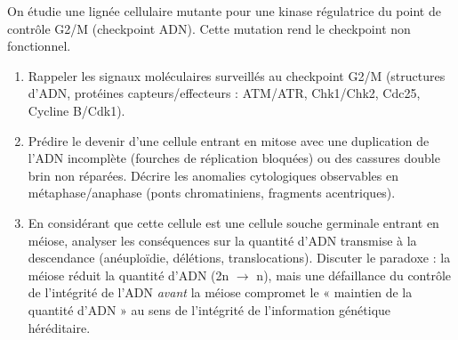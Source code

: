 \documentclass[11pt]{article}
\begin{document}
\begin{exercice}
On étudie une lignée cellulaire mutante pour une kinase régulatrice du point de contrôle G2/M (checkpoint ADN). Cette mutation rend le checkpoint non fonctionnel.
\begin{enumerate}
    \item Rappeler les signaux moléculaires surveillés au checkpoint G2/M (structures d'ADN, protéines capteurs/effecteurs : ATM/ATR, Chk1/Chk2, Cdc25, Cycline B/Cdk1).
    \item Prédire le devenir d'une cellule entrant en mitose avec une duplication de l'ADN incomplète (fourches de réplication bloquées) ou des cassures double brin non réparées. Décrire les anomalies cytologiques observables en métaphase/anaphase (ponts chromatiniens, fragments acentriques).
    \item En considérant que cette cellule est une cellule souche germinale entrant en méiose, analyser les conséquences sur la quantité d'ADN transmise à la descendance (anéuploïdie, délétions, translocations). Discuter le paradoxe : la méiose réduit la quantité d'ADN (2n $\to$ n), mais une défaillance du contrôle de l'intégrité de l'ADN \textit{avant} la méiose compromet le « maintien de la quantité d'ADN » au sens de l'intégrité de l'information génétique héréditaire.
\end{enumerate}
\end{exercice}
\end{document}
